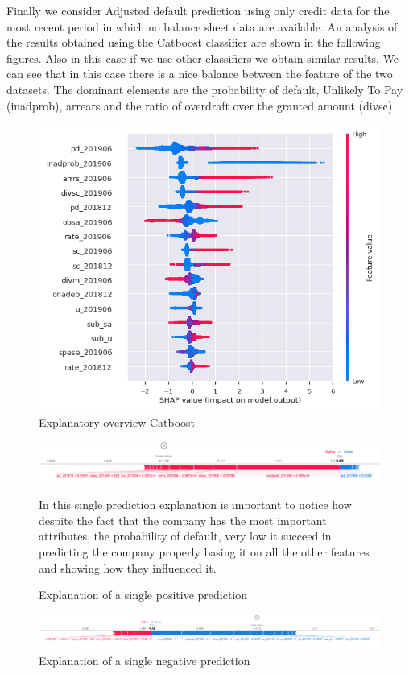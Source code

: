 Finally we consider Adjusted default prediction using only credit data for  the most recent period in which no balance sheet data are available. An analysis of the results obtained using the Catboost classifier are shown in the following figures. Also in this case if we use other classifiers we obtain similar results. We can see that in this case there is a nice balance between the feature of the two datasets. The dominant elements are the probability of default, Unlikely To Pay (inadprob), arrears and the ratio of overdraft over the granted amount (divsc)


\begin{figure}[H]
\includegraphics[scale = 0.6]{latex/figs/anac_exp.png}

\caption{Explanatory overview Catboost}
\end{figure}
\begin{figure}[H]
\includegraphics[scale = 0.3]{latex/figs/anac_exp2.png}

In this single prediction explanation is important to notice how despite the fact that the company has the most important attributes, the probability of default, very low it succeed in predicting the company properly basing it on all the other features and showing how they influenced it. 
\caption{Explanation of a single positive prediction}
\end{figure}
\begin{figure}[H]
\includegraphics[scale = 0.3]{latex/figs/anac_exp1.png}

\caption{Explanation of a single negative prediction}
\end{figure}

